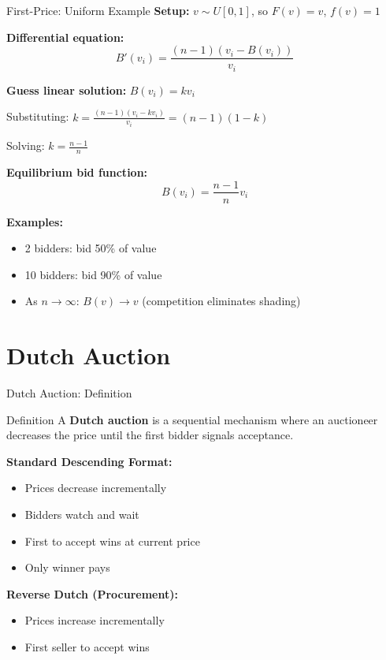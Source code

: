 \documentclass[xcolor={x11names}, aspectratio=169 ]{beamer}
\begin{document}
\begin{frame}{First-Price: Uniform Example}
\textbf{Setup:} $v \sim U[0,1]$, so $F(v) = v$, $f(v) = 1$

\textbf{Differential equation:}
$$B'(v_i) = \frac{(n-1)(v_i - B(v_i))}{v_i}$$

\textbf{Guess linear solution:} $B(v_i) = kv_i$

Substituting: $k = \frac{(n-1)(v_i - kv_i)}{v_i} = (n-1)(1-k)$

Solving: $k = \frac{n-1}{n}$

\textbf{Equilibrium bid function:}
$$\boxed{B(v_i) = \frac{n-1}{n} v_i}$$

\textbf{Examples:}
\begin{itemize}
  \item 2 bidders: bid 50\% of value
  \item 10 bidders: bid 90\% of value  
  \item As $n \to \infty$: $B(v) \to v$ (competition eliminates shading)
\end{itemize}
\end{frame}

\section{Dutch Auction}

\begin{frame}{Dutch Auction: Definition}
\begin{block}{Definition}
A \textbf{Dutch auction} is a sequential mechanism where an auctioneer decreases the price until the first bidder signals acceptance.
\end{block}

\textbf{Standard Descending Format:}
\begin{itemize}
\item Prices decrease incrementally
\item Bidders watch and wait
\item First to accept wins at current price
\item Only winner pays
\end{itemize}

\textbf{Reverse Dutch (Procurement):}
\begin{itemize}
\item Prices increase incrementally
\item First seller to accept wins
\end{itemize}
\end{frame}
\end{document}
